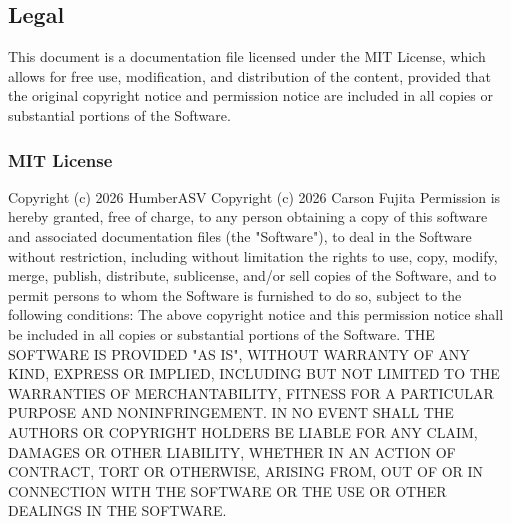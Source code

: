 \newpage %

\subsection{Legal}
This document is a documentation file licensed under the MIT License, which allows for free use, modification, and distribution of the content, provided that the original copyright notice and permission notice are included in all copies or substantial portions of the Software.


\subsubsection{MIT License}

 Copyright (c) 2026 HumberASV \newline
 Copyright (c) 2026 Carson Fujita \newline
 \newline
 Permission is hereby granted, free of charge, to any person obtaining a copy
 of this software and associated documentation files (the "Software"), to deal
 in the Software without restriction, including without limitation the rights
 to use, copy, modify, merge, publish, distribute, sublicense, and/or sell
 copies of the Software, and to permit persons to whom the Software is
 furnished to do so, subject to the following conditions:
\newline
 The above copyright notice and this permission notice shall be included in all
 copies or substantial portions of the Software.
\newline
 THE SOFTWARE IS PROVIDED "AS IS", WITHOUT WARRANTY OF ANY KIND, EXPRESS OR
 IMPLIED, INCLUDING BUT NOT LIMITED TO THE WARRANTIES OF MERCHANTABILITY,
 FITNESS FOR A PARTICULAR PURPOSE AND NONINFRINGEMENT. IN NO EVENT SHALL THE
 AUTHORS OR COPYRIGHT HOLDERS BE LIABLE FOR ANY CLAIM, DAMAGES OR OTHER
 LIABILITY, WHETHER IN AN ACTION OF CONTRACT, TORT OR OTHERWISE, ARISING FROM,
 OUT OF OR IN CONNECTION WITH THE SOFTWARE OR THE USE OR OTHER DEALINGS IN THE
 SOFTWARE.

\newpage %